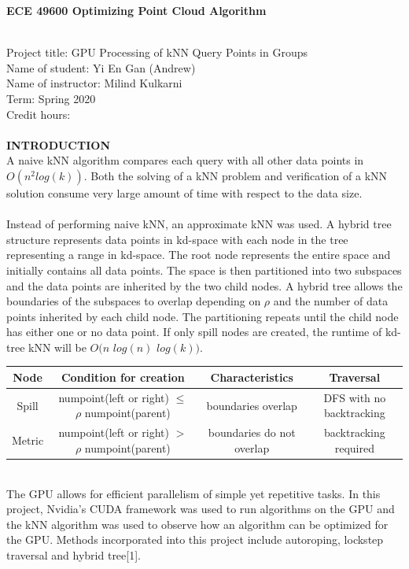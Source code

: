 \documentclass{article}
\begin{document}
\begin{center}
\textbf{\LARGE ECE 49600 Optimizing Point Cloud Algorithm}
\end{center}
~\\
Project title: \tab GPU Processing of kNN Query Points in Groups\\
Name of student: \tab Yi En Gan (Andrew)\\
Name of instructor: \tab Milind Kulkarni\\
Term: \tab Spring 2020\\
Credit hours: \\
\\
\large
\noindent
\textbf{INTRODUCTION}\\
\normalsize
\newline
A naive kNN algorithm compares each query with all other data points in $O(n^{2} log(k))$. Both the solving of a kNN problem and verification of a kNN solution consume very large amount of time with respect to the data size.\\
\\
Instead of performing naive kNN, an approximate kNN was used. A hybrid tree structure represents data points in kd-space with each node in the tree representing a range in kd-space. The root node represents the entire space and initially contains all data points. The space is then partitioned into two subspaces and the data points are inherited by the two child nodes. A hybrid tree allows the boundaries of the subspaces to overlap depending on $\rho$ and the number of data points inherited by each child node. The partitioning repeats until the child node has either one or no data point. If only spill nodes are created, the runtime of kd-tree kNN will be $O(n$ $log(n)$ $log(k))$.
\begin{center}
 \begin{tabular}{||c c c c||} 
 \hline
 Node & Condition for creation & Characteristics & Traversal\\ [0.5ex] 
 \hline\hline
 Spill & numpoint(left or right) $\leq$ $\rho$ numpoint(parent) & boundaries overlap & DFS with no backtracking \\ 
 \hline
 Metric & numpoint(left or right) $>$ $\rho$ numpoint(parent) & boundaries do not overlap & backtracking required\\
 \hline
\end{tabular}
\end{center}
~\\
The GPU allows for efficient parallelism of simple yet repetitive tasks. In this project, Nvidia's CUDA framework was used to run algorithms on the GPU and the kNN algorithm was used to observe how an algorithm can be optimized for the GPU. Methods incorporated into this project include autoroping, lockstep traversal and hybrid tree[1].\\\\
\end{document}
